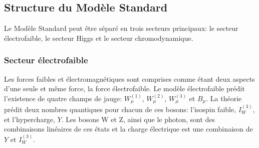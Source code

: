 

\subsection{Structure du Modèle Standard}
\label{sec:ms:th:struct}

Le Modèle Standard peut être séparé en trois secteurs principaux: le
secteur électrofaible, le secteur Higgs et le secteur chromodynamique.

\subsubsection{Secteur électrofaible}
\label{sec:ms:th:struct:ewk}

Les forces faibles et électromagnétiques sont comprises comme étant
deux aspects d'une seule et même force, la force électrofaible.
Le
modèle électrofaible prédit l'existence de quatre champs de jauge:
$W^{(1)}_\mu$, $W^{(2)}_\mu$, $W^{(3)}_\mu$ et $B_\mu$. La théorie
prédit deux nombres quantiques pour chacun de ces bosons: l'isospin
faible, $I^{(3)}_W$, et l'hypercharge, $Y$. Les bosons W et Z, ainsi
que le photon, sont des combinaisons linéaires de ces états et la
charge électrique est une combinaison  de $Y$ et $I^{(3)}_W$.



